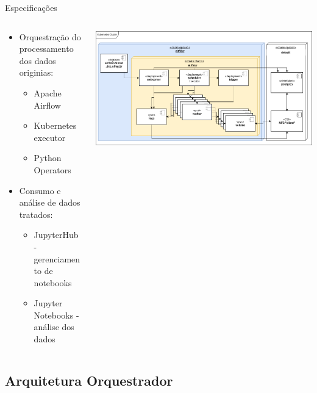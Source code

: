 \documentclass[10pt,brazil]{beamer}
\theoremstyle{definition}
\begin{document}
\begin{frame}[allowframebreaks]{Especificações}
\begin{columns}
\begin{column}{0.5\textwidth}
\begin{center}
      \end{center}
    \end{column}
  \end{columns}
  
  \framebreak
  
  \begin{columns}
    \begin{column}{0.5\textwidth}
      \begin{itemize}
        \item Orquestração do processamento dos dados originias:
              \begin{itemize}
                \item Apache Airflow\textregistered\
                \item Kubernetes executor
                \item Python Operators
              \end{itemize}
        \item Consumo e análise de dados tratados:
              \begin{itemize}
                \item JupyterHub - gerenciamento de notebooks
                \item Jupyter Notebooks - análise dos dados
              \end{itemize}
      \end{itemize}
    \end{column}
    \begin{column}{0.5\textwidth}
      \includegraphics[width=1\textwidth]{tcc_airflow_deloy.png}
    \end{column}
  \end{columns}
\end{frame}


\subsection{Arquitetura Orquestrador}
\end{document}
